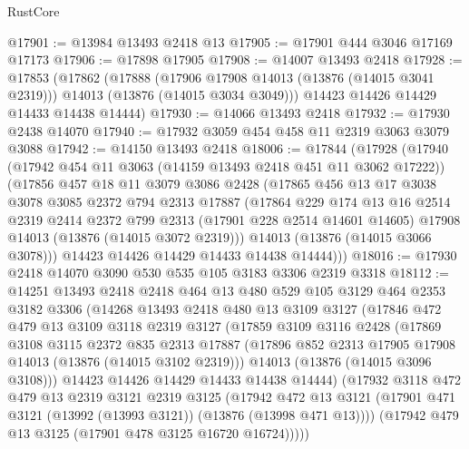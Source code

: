 \begin{lexlean}{RustCore}
\begin{coremodule}
@17901 := @13984 @13493 @2418 @13
@17905 := @17901 @444 @3046 @17169 @17173
@17906 := @17898 @17905
@17908 := @14007 @13493 @2418
@17928 := @17853
    (@17862
      (@17888
        (@17906 @17908 @14013 (@13876 (@14015 @3041 @2319)))
        @14013
        (@13876 (@14015 @3034 @3049)))
      @14423
      @14426
      @14429
      @14433
      @14438
      @14444)
@17930 := @14066 @13493 @2418
@17932 := @17930 @2438 @14070
@17940 := @17932 @3059 @454 @458 @11 @2319 @3063 @3079 @3088
@17942 := @14150 @13493 @2418
@18006 := @17844
    (@17928
      (@17940
        (@17942 @454 @11 @3063 (@14159 @13493 @2418 @451 @11 @3062 @17222))
        (@17856
          @457
          @18
          @11
          @3079
          @3086
          @2428
          (@17865
            @456
            @13
            @17
            @3038
            @3078
            @3085
            @2372
            @794
            @2313
            @17887
            (@17864
              @229
              @174
              @13
              @16
              @2514
              @2319
              @2414
              @2372
              @799
              @2313
              (@17901 @228 @2514 @14601 @14605)
              @17908
              @14013
              (@13876 (@14015 @3072 @2319)))
            @14013
            (@13876 (@14015 @3066 @3078)))
          @14423
          @14426
          @14429
          @14433
          @14438
          @14444)))
@18016 := @17930 @2418 @14070 @3090 @530 @535 @105 @3183 @3306 @2319 @3318
@18112 := @14251
    @13493
    @2418
    @2418
    @464
    @13
    @480
    @529
    @105
    @3129
    @464
    @2353
    @3182
    @3306
    (@14268
      @13493
      @2418
      @480
      @13
      @3109
      @3127
      (@17846
        @472
        @479
        @13
        @3109
        @3118
        @2319
        @3127
        (@17859
          @3109
          @3116
          @2428
          (@17869
            @3108
            @3115
            @2372
            @835
            @2313
            @17887
            (@17896 @852 @2313 @17905 @17908 @14013 (@13876 (@14015 @3102 @2319)))
            @14013
            (@13876 (@14015 @3096 @3108)))
          @14423
          @14426
          @14429
          @14433
          @14438
          @14444)
        (@17932
          @3118
          @472
          @479
          @13
          @2319
          @3121
          @2319
          @3125
          (@17942
            @472
            @13
            @3121
            (@17901 @471 @3121 (@13992 (@13993 @3121)) (@13876 (@13998 @471 @13))))
          (@17942 @479 @13 @3125 (@17901 @478 @3125 @16720 @16724)))))

\end{coremodule}
\end{lexlean}
